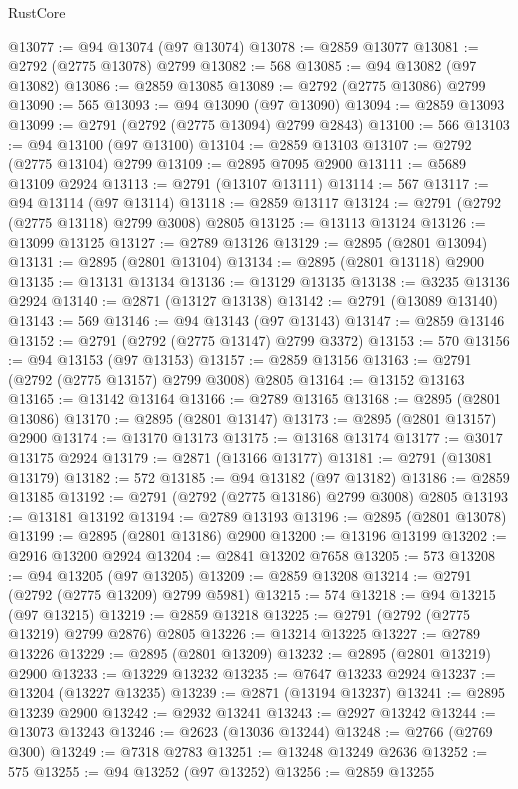 \begin{lexlean}{RustCore}
\begin{coremodule}
@13077 := @94 @13074 (@97 @13074)
@13078 := @2859 @13077
@13081 := @2792 (@2775 @13078) @2799
@13082 := 568
@13085 := @94 @13082 (@97 @13082)
@13086 := @2859 @13085
@13089 := @2792 (@2775 @13086) @2799
@13090 := 565
@13093 := @94 @13090 (@97 @13090)
@13094 := @2859 @13093
@13099 := @2791 (@2792 (@2775 @13094) @2799 @2843)
@13100 := 566
@13103 := @94 @13100 (@97 @13100)
@13104 := @2859 @13103
@13107 := @2792 (@2775 @13104) @2799
@13109 := @2895 @7095 @2900
@13111 := @5689 @13109 @2924
@13113 := @2791 (@13107 @13111)
@13114 := 567
@13117 := @94 @13114 (@97 @13114)
@13118 := @2859 @13117
@13124 := @2791 (@2792 (@2775 @13118) @2799 @3008) @2805
@13125 := @13113 @13124
@13126 := @13099 @13125
@13127 := @2789 @13126
@13129 := @2895 (@2801 @13094)
@13131 := @2895 (@2801 @13104)
@13134 := @2895 (@2801 @13118) @2900
@13135 := @13131 @13134
@13136 := @13129 @13135
@13138 := @3235 @13136 @2924
@13140 := @2871 (@13127 @13138)
@13142 := @2791 (@13089 @13140)
@13143 := 569
@13146 := @94 @13143 (@97 @13143)
@13147 := @2859 @13146
@13152 := @2791 (@2792 (@2775 @13147) @2799 @3372)
@13153 := 570
@13156 := @94 @13153 (@97 @13153)
@13157 := @2859 @13156
@13163 := @2791 (@2792 (@2775 @13157) @2799 @3008) @2805
@13164 := @13152 @13163
@13165 := @13142 @13164
@13166 := @2789 @13165
@13168 := @2895 (@2801 @13086)
@13170 := @2895 (@2801 @13147)
@13173 := @2895 (@2801 @13157) @2900
@13174 := @13170 @13173
@13175 := @13168 @13174
@13177 := @3017 @13175 @2924
@13179 := @2871 (@13166 @13177)
@13181 := @2791 (@13081 @13179)
@13182 := 572
@13185 := @94 @13182 (@97 @13182)
@13186 := @2859 @13185
@13192 := @2791 (@2792 (@2775 @13186) @2799 @3008) @2805
@13193 := @13181 @13192
@13194 := @2789 @13193
@13196 := @2895 (@2801 @13078)
@13199 := @2895 (@2801 @13186) @2900
@13200 := @13196 @13199
@13202 := @2916 @13200 @2924
@13204 := @2841 @13202 @7658
@13205 := 573
@13208 := @94 @13205 (@97 @13205)
@13209 := @2859 @13208
@13214 := @2791 (@2792 (@2775 @13209) @2799 @5981)
@13215 := 574
@13218 := @94 @13215 (@97 @13215)
@13219 := @2859 @13218
@13225 := @2791 (@2792 (@2775 @13219) @2799 @2876) @2805
@13226 := @13214 @13225
@13227 := @2789 @13226
@13229 := @2895 (@2801 @13209)
@13232 := @2895 (@2801 @13219) @2900
@13233 := @13229 @13232
@13235 := @7647 @13233 @2924
@13237 := @13204 (@13227 @13235)
@13239 := @2871 (@13194 @13237)
@13241 := @2895 @13239 @2900
@13242 := @2932 @13241
@13243 := @2927 @13242
@13244 := @13073 @13243
@13246 := @2623 (@13036 @13244)
@13248 := @2766 (@2769 @300)
@13249 := @7318 @2783
@13251 := @13248 @13249 @2636
@13252 := 575
@13255 := @94 @13252 (@97 @13252)
@13256 := @2859 @13255

\end{coremodule}
\end{lexlean}
